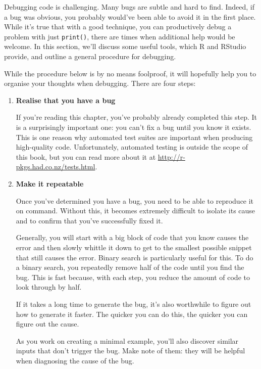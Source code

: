 Debugging code is challenging. Many bugs are subtle and hard to find.
Indeed, if a bug was obvious, you probably would've been able to avoid
it in the first place. While it's true that with a good technique, you
can productively debug a problem with just \texttt{print()}, there are
times when additional help would be welcome. In this section, we'll
discuss some useful tools, which R and RStudio provide, and outline a
general procedure for debugging.  

While the procedure below is by no means foolproof, it will hopefully
help you to organise your thoughts when debugging. There are four steps:

\begin{enumerate}
\def\labelenumi{\arabic{enumi}.}
\item
  \textbf{Realise that you have a bug}

  If you're reading this chapter, you've probably already completed this
  step. It is a surprisingly important one: you can't fix a bug until
  you know it exists. This is one reason why automated test suites are
  important when producing high-quality code. Unfortunately, automated
  testing is outside the scope of this book, but you can read more about
  it at \url{http://r-pkgs.had.co.nz/tests.html}.
\item
  \textbf{Make it repeatable}

  Once you've determined you have a bug, you need to be able to
  reproduce it on command. Without this, it becomes extremely difficult
  to isolate its cause and to confirm that you've successfully fixed it.

  Generally, you will start with a big block of code that you know
  causes the error and then slowly whittle it down to get to the
  smallest possible snippet that still causes the error. Binary search
  is particularly useful for this. To do a binary search, you repeatedly
  remove half of the code until you find the bug. This is fast because,
  with each step, you reduce the amount of code to look through by half.

  If it takes a long time to generate the bug, it's also worthwhile to
  figure out how to generate it faster. The quicker you can do this, the
  quicker you can figure out the cause.

  As you work on creating a minimal example, you'll also discover
  similar inputs that don't trigger the bug. Make note of them: they
  will be helpful when diagnosing the cause of the bug.


\end{enumerate}
